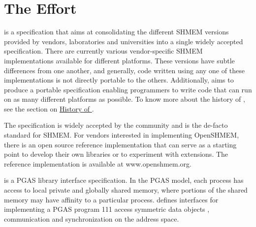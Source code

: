 
\section{The \openshmem Effort}

\openshmem is a specification that aims at consolidating the different
SHMEM versions provided by vendors, laboratories and universities 
into a single widely accepted specification. There are currently various vendor-specific SHMEM implementations available for
different platforms. These versions have subtle differences from one
another, and generally, code written using any one of these
implementations is not directly portable to the others. Additionally, \openshmem aims
to produce a portable specification enabling programmers to write
\openshmem code that can run on as many different platforms
as possible. To know more about the history of \openshmem, see the section on \hyperref[sec:openshmem_history]{History of \openshmem}.

The \openshmem specification is widely accepted by the community and is the de-facto
standard for SHMEM.  For vendors interested in implementing OpenSHMEM, there is an open source reference implementation
that can serve as a starting point to develop their own libraries or to experiment with extensions. The reference implementation is available at www.openshmem.org.


\openshmem is a \ac{PGAS} library interface specification. In the \ac{PGAS} model, each process has access to 
local private and globally shared memory, where portions of the shared memory may have affinity to a particular process. \openshmem
defines interfaces for implementing a \ac{PGAS} program 111 access symmetric data objects ,  communication and synchronization on the address space. 

